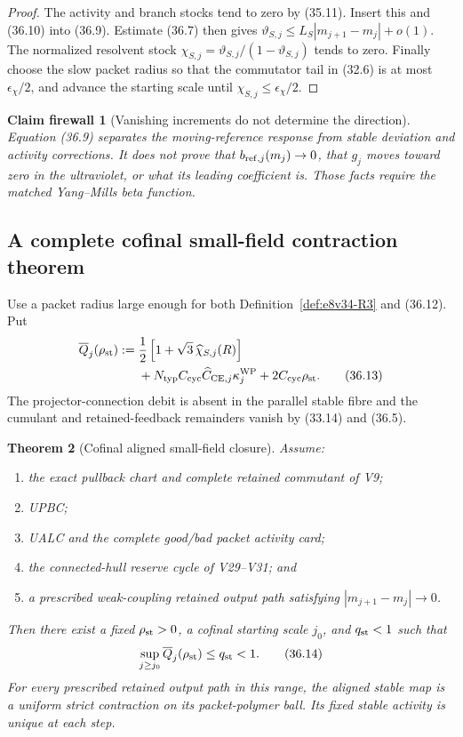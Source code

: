 \documentclass[11pt,oneside]{book}
\newtheorem{theorem}{Theorem}[chapter]
\newtheorem{firewall}[theorem]{Claim firewall}
\theoremstyle{definition}
\theoremstyle{remark}
\begin{document}
\begin{proof}
The activity and branch stocks tend to zero by (35.11).  Insert this
and (36.10) into (36.9).  Estimate (36.7) then gives
\(\vartheta_{S,j}\leq L_S|m_{j+1}-m_j|+o(1)\).
The normalized resolvent stock
\(\chi_{S,j}=\vartheta_{S,j}/(1-\vartheta_{S,j})\) tends to zero.
Finally choose the slow packet radius so that the commutator tail in
(32.6) is at most \(\epsilon_\chi/2\), and advance the starting scale
until \(\chi_{S,j}\leq\epsilon_\chi/2\).
\end{proof}

\begin{firewall}[Vanishing increments do not determine the direction]
\label{fire:e8v36-beta-sign}
Equation (36.9) separates the moving-reference response from stable
deviation and activity corrections.  It does not prove that
\(b_{{\rm ref},j}(m_j)\to0\), that \(g_j\) moves toward zero in the
ultraviolet, or what its leading coefficient is.  Those facts require
the matched Yang--Mills beta function.
\end{firewall}

\subsection{A complete cofinal small-field contraction theorem}

Use a packet radius large enough for both
Definition~\ref{def:e8v34-R3} and (36.12).  Put
\[
\begin{split}
 \overline Q_j(\rho_{\rm st})
 :={}&
 \frac12\left[
 1+\sqrt3\,\widehat\chi_{S,j}(R)
 \right]\\
 &+
 N_{\rm typ}C_{\rm cyc}\widehat C_{{\rm CE},j}
 \kappa_j^{\rm WP}
 +2C_{\rm cyc}\rho_{\rm st}.                                  \tag{36.13}
\end{split}
\]
The projector-connection debit is absent in the parallel stable
fibre and the cumulant and retained-feedback remainders vanish by
(33.14) and (36.5).

\begin{theorem}[Cofinal aligned small-field closure]
\label{thm:e8v36-small-field-closure}
Assume:
\begin{enumerate}
\item the exact pullback chart and complete retained commutant of V9;
\item UPBC;
\item UALC and the complete good/bad packet activity card;
\item the connected-hull reserve cycle of V29--V31; and
\item a prescribed weak-coupling retained output path satisfying
      \(|m_{j+1}-m_j|\to0\).
\end{enumerate}
Then there exist a fixed \(\rho_{\rm st}>0\), a cofinal starting
scale \(j_0\), and \(q_{\rm st}<1\) such that
\[
 \sup_{j\geq j_0}\overline Q_j(\rho_{\rm st})
 \leq q_{\rm st}<1.                                             \tag{36.14}
\]
For every prescribed retained output path in this range, the aligned
stable map is a uniform strict contraction on its packet-polymer
ball.  Its fixed stable activity is unique at each step.
\end{theorem}
\end{document}
